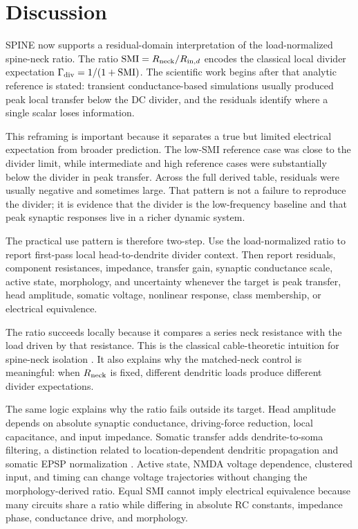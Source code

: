 \section{Discussion}

SPINE now supports a residual-domain interpretation of the load-normalized spine-neck ratio. The ratio $\mathrm{SMI}=R_{\mathrm{neck}}/R_{\mathrm{in},d}$ encodes the classical local divider expectation $\Gamma_{\mathrm{div}}=1/(1+\mathrm{SMI})$. The scientific work begins after that analytic reference is stated: transient conductance-based simulations usually produced peak local transfer below the DC divider, and the residuals identify where a single scalar loses information.

This reframing is important because it separates a true but limited electrical expectation from broader prediction. The low-SMI reference case was close to the divider limit, while intermediate and high reference cases were substantially below the divider in peak transfer. Across the full derived table, residuals were usually negative and sometimes large. That pattern is not a failure to reproduce the divider; it is evidence that the divider is the low-frequency baseline and that peak synaptic responses live in a richer dynamic system.

The practical use pattern is therefore two-step. Use the load-normalized ratio to report first-pass local head-to-dendrite divider context. Then report residuals, component resistances, impedance, transfer gain, synaptic conductance scale, active state, morphology, and uncertainty whenever the target is peak transfer, head amplitude, somatic voltage, nonlinear response, class membership, or electrical equivalence.

The ratio succeeds locally because it compares a series neck resistance with the load driven by that resistance. This is the classical cable-theoretic intuition for spine-neck isolation \citep{Rall1964,SegevRall1988,Yuste2013,Magee2000Review}. It also explains why the matched-neck control is meaningful: when $R_{\mathrm{neck}}$ is fixed, different dendritic loads produce different divider expectations.

The same logic explains why the ratio fails outside its target. Head amplitude depends on absolute synaptic conductance, driving-force reduction, local capacitance, and input impedance. Somatic transfer adds dendrite-to-soma filtering, a distinction related to location-dependent dendritic propagation and somatic EPSP normalization \citep{MageeCook2000}. Active state, NMDA voltage dependence, clustered input, and timing can change voltage trajectories without changing the morphology-derived ratio. Equal SMI cannot imply electrical equivalence because many circuits share a ratio while differing in absolute RC constants, impedance phase, conductance drive, and morphology.

